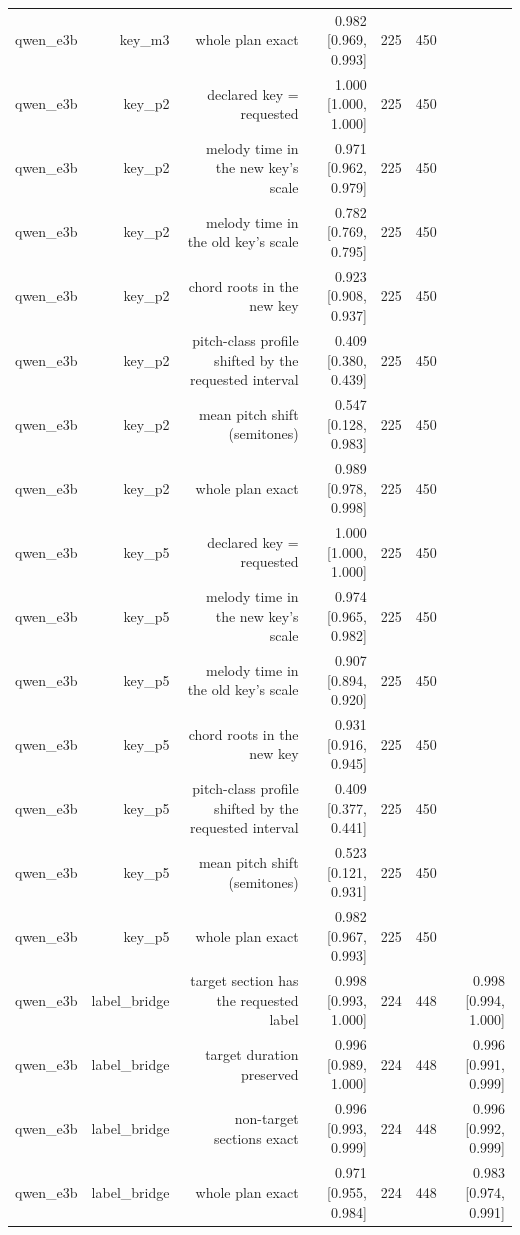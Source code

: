 \begin{table}[t]
\begin{tabular}{lrrrrrr}
qwen\_e3b & key\_m3 & whole plan exact & 0.982 [0.969, 0.993] & 225 & 450 &  \\
qwen\_e3b & key\_p2 & declared key = requested & 1.000 [1.000, 1.000] & 225 & 450 &  \\
qwen\_e3b & key\_p2 & melody time in the new key's scale & 0.971 [0.962, 0.979] & 225 & 450 &  \\
qwen\_e3b & key\_p2 & melody time in the old key's scale & 0.782 [0.769, 0.795] & 225 & 450 &  \\
qwen\_e3b & key\_p2 & chord roots in the new key & 0.923 [0.908, 0.937] & 225 & 450 &  \\
qwen\_e3b & key\_p2 & pitch-class profile shifted by the requested interval & 0.409 [0.380, 0.439] & 225 & 450 &  \\
qwen\_e3b & key\_p2 & mean pitch shift (semitones) & 0.547 [0.128, 0.983] & 225 & 450 &  \\
qwen\_e3b & key\_p2 & whole plan exact & 0.989 [0.978, 0.998] & 225 & 450 &  \\
qwen\_e3b & key\_p5 & declared key = requested & 1.000 [1.000, 1.000] & 225 & 450 &  \\
qwen\_e3b & key\_p5 & melody time in the new key's scale & 0.974 [0.965, 0.982] & 225 & 450 &  \\
qwen\_e3b & key\_p5 & melody time in the old key's scale & 0.907 [0.894, 0.920] & 225 & 450 &  \\
qwen\_e3b & key\_p5 & chord roots in the new key & 0.931 [0.916, 0.945] & 225 & 450 &  \\
qwen\_e3b & key\_p5 & pitch-class profile shifted by the requested interval & 0.409 [0.377, 0.441] & 225 & 450 &  \\
qwen\_e3b & key\_p5 & mean pitch shift (semitones) & 0.523 [0.121, 0.931] & 225 & 450 &  \\
qwen\_e3b & key\_p5 & whole plan exact & 0.982 [0.967, 0.993] & 225 & 450 &  \\
qwen\_e3b & label\_bridge & target section has the requested label & 0.998 [0.993, 1.000] & 224 & 448 & 0.998 [0.994, 1.000] \\
qwen\_e3b & label\_bridge & target duration preserved & 0.996 [0.989, 1.000] & 224 & 448 & 0.996 [0.991, 0.999] \\
qwen\_e3b & label\_bridge & non-target sections exact & 0.996 [0.993, 0.999] & 224 & 448 & 0.996 [0.992, 0.999] \\
qwen\_e3b & label\_bridge & whole plan exact & 0.971 [0.955, 0.984] & 224 & 448 & 0.983 [0.974, 0.991] \\

\end{tabular}
\end{table}
